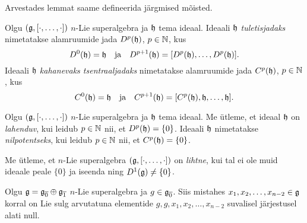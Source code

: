Arvestades lemmat saame defineerida järgmised mõisted.

\begin{dfn}
    Olgu $(\mathfrak{g}, [\cdot, \dots, \cdot])$ $n$-Lie superalgebra ja $\mathfrak{h}$
    tema ideaal. Ideaali $\mathfrak{h}$ \emph{tuletisjadaks} nimetatakse
    alamruumide jada $D^p(\mathfrak{h})$, $p \in \mathbb{N}$, kus
    \[
        D^0(\mathfrak{h}) = \mathfrak{h} \quad \text{ja} \quad
        D^{p+1}(\mathfrak{h}) = [D^p(\mathfrak{h}), \dots, D^p(\mathfrak{h})].
    \]
    Ideaali $\mathfrak{h}$ \emph{kahanevaks tsentraaljadaks} nimetatakse
    alamruumide jada $C^p(\mathfrak{h})$, $p \in \mathbb{N}$, kus
    \[
        C^0(\mathfrak{h}) = \mathfrak{h} \quad \text{ja} \quad
        C^{p+1}(\mathfrak{h}) = [C^p(\mathfrak{h}), \mathfrak{h}, \dots, \mathfrak{h}].
    \]
\end{dfn}

\begin{dfn}
    Olgu $(\mathfrak{g}, [\cdot, \dots, \cdot])$ $n$-Lie superalgebra ja $\mathfrak{h}$
    tema ideaal. Me ütleme, et ideaal $\mathfrak{h}$ on \emph{lahenduv}, kui
    leidub $p \in \mathbb{N}$ nii, et $D^p(\mathfrak{h}) = \{0\}$. Ideaali $\mathfrak{h}$
    nimetatakse \emph{nilpotentseks}, kui leidub $p \in \mathbb{N}$
    nii, et $C^p(\mathfrak{h}) = \{0\}$.
\end{dfn}

\begin{dfn}
    Me ütleme, et $n$-Lie superalgebra $(\mathfrak{g}, [\cdot, \dots, \cdot])$
    on \emph{lihtne}, kui tal ei ole muid ideaale peale $\{0\}$
    ja iseenda ning $D^1(\mathfrak{g}) \neq \{0\}$.
\end{dfn}

\begin{lemma}
    Olgu $\mathfrak{g} = \mathfrak{g}_{\overline{0}} \oplus \mathfrak{g}_{\overline{1}}$
    $n$-Lie superalgebra ja $g \in \mathfrak{g}_{\overline{0}}$. Siis
    mistahes $x_1, x_2, \dots, x_{n-2} \in \mathfrak{g}$ korral on
    Lie sulg arvutatuna elementide $g, g, x_1, x_2, \dots, x_{n-2}$
    suvalisel järjestusel alati null.
\end{lemma}

